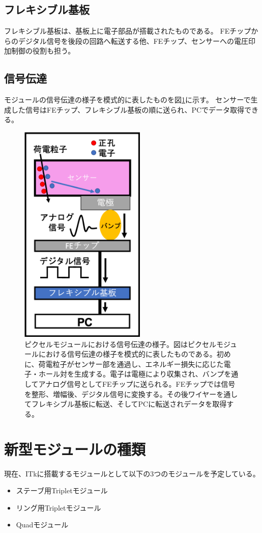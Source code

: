 \subsection{フレキシブル基板}
フレキシブル基板は、基板上に電子部品が搭載されたものである。
FEチップからのデジタル信号を後段の回路へ転送する他、FEチップ、センサーへの電圧印加制御の役割も担う。

\subsection{信号伝達}
モジュールの信号伝達の様子を模式的に表したものを図\ref{module_electric_overview}に示す。
センサーで生成した信号はFEチップ、フレキシブル基板の順に送られ、PCでデータ取得できる。

\begin{figure}[bpt]\centering
\includegraphics[width=6cm]{module_electric_overview}
\caption[ピクセルモジュールにおける信号伝達の様子]{ピクセルモジュールにおける信号伝達の様子。図はピクセルモジュールにおける信号伝達の様子を模式的に表したものである。初めに、荷電粒子がセンサー部を通過し、エネルギー損失に応じた電子・ホール対を生成する。電子は電極により収集され、バンプを通してアナログ信号としてFEチップに送られる。FEチップでは信号を整形、増幅後、デジタル信号に変換する。その後ワイヤーを通してフレキシブル基板に転送、そしてPCに転送されデータを取得する。}
\label{module_electric_overview}
\end{figure}

\clearpage
\section{新型モジュールの種類}
現在、ITkに搭載するモジュールとして以下の3つのモジュールを予定している。
\begin{itemize}
  \item ステーブ用Tripletモジュール
  \item リング用Tripletモジュール
  \item Quadモジュール
\end{itemize}

